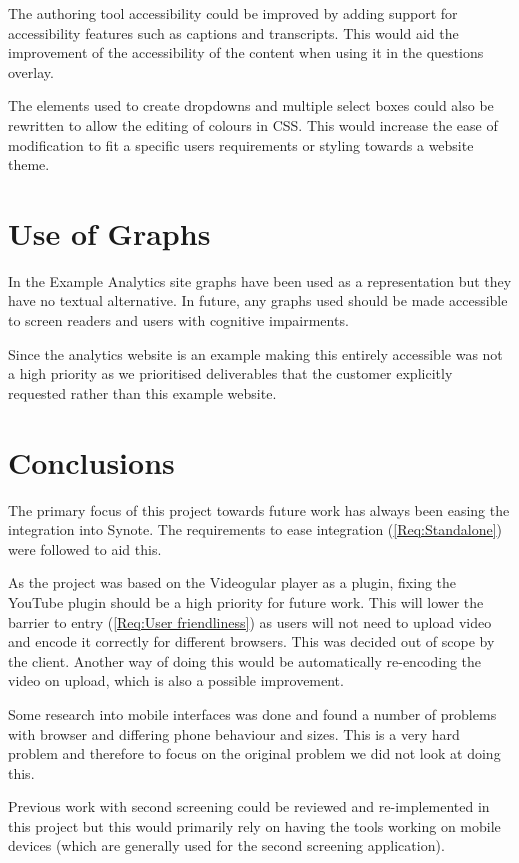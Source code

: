 The authoring tool accessibility could be improved by adding support for accessibility features such as captions and transcripts. This would aid the improvement of the accessibility of the content when using it in the questions overlay.

The elements used to create dropdowns and multiple select boxes could also be rewritten to allow the editing of colours in \gls{CSS}. This would increase the ease of modification to fit a specific users requirements or styling towards a website theme.

\section{Use of Graphs}

In the Example Analytics site graphs have been used as a representation but they have no textual alternative. In future, any graphs used should be made accessible to screen readers and users with cognitive impairments.

Since the analytics website is an example making this entirely accessible was not a high priority as we prioritised deliverables that the customer explicitly requested rather than this example website.

\section{Conclusions}

The primary focus of this project towards future work has always been easing the integration into Synote. The requirements to ease integration (\cref{Req:Standalone}) were followed to aid this.

As the project was based on the Videogular player as a plugin, fixing the YouTube plugin should be a high priority for future work. This will lower the barrier to entry (\cref{Req:User friendliness}) as users will not need to upload video and encode it correctly for different browsers. This was decided out of scope by the client. Another way of doing this would be automatically re-encoding the video on upload, which is also a possible improvement.

Some research into mobile interfaces was done and found a number of problems with browser and differing phone behaviour and sizes. This is a very hard problem and therefore to focus on the original problem we did not look at doing this.

Previous work with second screening could be reviewed and re-implemented in this project but this would primarily rely on having the tools working on mobile devices (which are generally used for the second screening application).

